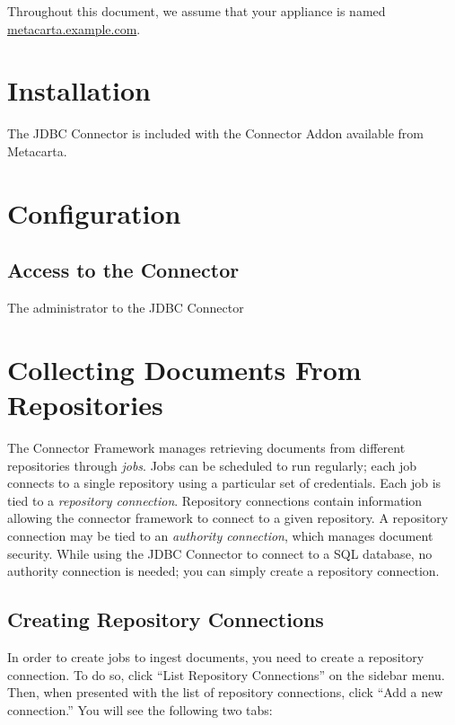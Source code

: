 \begin{changemargin}{1.5in}{0in}
Throughout this document, we assume that your appliance is named \\
\url{metacarta.example.com}. 

\section{Installation}

The JDBC Connector is included with the Connector Addon
available from Metacarta. 

\section{Configuration}

\subsection{Access to the Connector}

The administrator to the JDBC Connector 


\section{Collecting Documents From Repositories} %

The Connector Framework manages retrieving documents from different
repositories through \emph{jobs}. Jobs can be scheduled to run
regularly; each job connects to a single repository using a particular
set of credentials. Each job is tied to a \emph{repository
connection}. Repository connections contain information allowing the
connector framework to connect to a given repository. A repository
connection may be tied to an \emph{authority connection}, which
manages document security. While using the JDBC Connector to connect
to a SQL database, no authority connection is needed; you can simply
create a repository connection.



\subsection{Creating Repository Connections}

In order to create jobs to ingest documents, you need to create a
repository connection. To do so, click ``List Repository
Connections'' on the sidebar menu. Then, when presented with the list
of repository connections, click ``Add a new connection.'' You will
see the following two tabs:


\end{changemargin}
